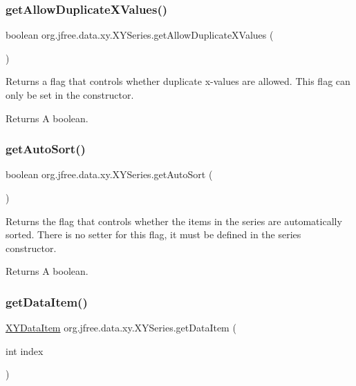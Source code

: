 \subsubsection{\texorpdfstring{get\+Allow\+Duplicate\+X\+Values()}{getAllowDuplicateXValues()}}
{\footnotesize\ttfamily boolean org.\+jfree.\+data.\+xy.\+X\+Y\+Series.\+get\+Allow\+Duplicate\+X\+Values (\begin{DoxyParamCaption}{ }\end{DoxyParamCaption})}

Returns a flag that controls whether duplicate x-\/values are allowed. This flag can only be set in the constructor.

\begin{DoxyReturn}{Returns}
A boolean. 
\end{DoxyReturn}
\mbox{\label{classorg_1_1jfree_1_1data_1_1xy_1_1_x_y_series_aecb5fbcd290d5585c7bbf1fd41d097d3}} 
\subsubsection{\texorpdfstring{get\+Auto\+Sort()}{getAutoSort()}}
{\footnotesize\ttfamily boolean org.\+jfree.\+data.\+xy.\+X\+Y\+Series.\+get\+Auto\+Sort (\begin{DoxyParamCaption}{ }\end{DoxyParamCaption})}

Returns the flag that controls whether the items in the series are automatically sorted. There is no setter for this flag, it must be defined in the series constructor.

\begin{DoxyReturn}{Returns}
A boolean. 
\end{DoxyReturn}
\mbox{\label{classorg_1_1jfree_1_1data_1_1xy_1_1_x_y_series_a20c74a3d070152c1b6b50cc4ed0f41c4}} 
\subsubsection{\texorpdfstring{get\+Data\+Item()}{getDataItem()}}
{\footnotesize\ttfamily \mbox{\hyperlink{classorg_1_1jfree_1_1data_1_1xy_1_1_x_y_data_item}{X\+Y\+Data\+Item}} org.\+jfree.\+data.\+xy.\+X\+Y\+Series.\+get\+Data\+Item (\begin{DoxyParamCaption}\item[{int}]{index }\end{DoxyParamCaption})}

